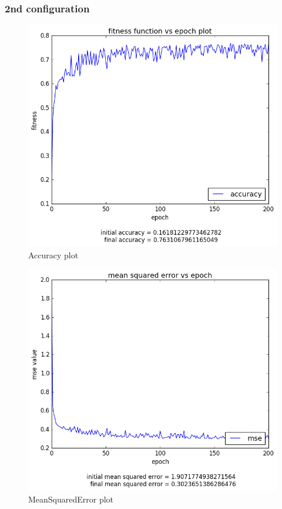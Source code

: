 \documentclass[12pt,a4paper]{article}
\begin{document}
\subsubsection{2nd configuration}
\begin{figure}[H]
\centering
\includegraphics[scale=0.4]{img/50_acc_2.png}
\caption{Accuracy plot}
\end{figure}
\begin{figure}[H]
\centering
\includegraphics[scale=0.4]{img/50_mse_2.png}
\caption{MeanSquaredError plot}
\end{figure}
\end{document}
